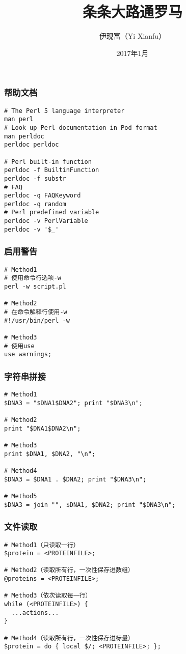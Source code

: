 


\title[条条大路通罗马]{条条大路通罗马}
\author[Yixf]{伊现富（Yi Xianfu）}
\date{2017年1月}

%
\begin{frame}
  \titlepage
\end{frame}

\begin{frame}[fragile]
  \frametitle{帮助文档}
\begin{lstlisting}
# The Perl 5 language interpreter
man perl
# Look up Perl documentation in Pod format
man perldoc
perldoc perldoc

# Perl built-in function
perldoc -f BuiltinFunction
perldoc -f substr
# FAQ
perldoc -q FAQKeyword
perldoc -q random
# Perl predefined variable
perldoc -v PerlVariable
perldoc -v '$_'
\end{lstlisting}
\end{frame}

\begin{frame}[fragile]
  \frametitle{启用警告}
\begin{lstlisting}
# Method1
# 使用命令行选项-w
perl -w script.pl

# Method2
# 在命令解释行使用-w
#!/usr/bin/perl -w

# Method3
# 使用use
use warnings;
\end{lstlisting}
\end{frame}

\begin{frame}[fragile]
  \frametitle{字符串拼接}
\begin{lstlisting}
# Method1
$DNA3 = "$DNA1$DNA2"; print "$DNA3\n";

# Method2
print "$DNA1$DNA2\n";

# Method3
print $DNA1, $DNA2, "\n";

# Method4
$DNA3 = $DNA1 . $DNA2; print "$DNA3\n";

# Method5
$DNA3 = join "", $DNA1, $DNA2; print "$DNA3\n";
\end{lstlisting}
\end{frame}

\begin{frame}[fragile]
  \frametitle{文件读取}
\begin{lstlisting}
# Method1（只读取一行）
$protein = <PROTEINFILE>;

# Method2（读取所有行，一次性保存进数组）
@proteins = <PROTEINFILE>;

# Method3（依次读取每一行）
while (<PROTEINFILE>) {
  ...actions...
}

# Method4（读取所有行，一次性保存进标量）
$protein = do { local $/; <PROTEINFILE>; };
\end{lstlisting}
\end{frame}

